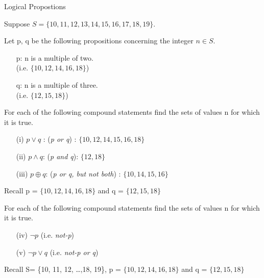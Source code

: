 

{Logical Propostions}

Suppose $S = \{10,11,12,13,14,15,16,17,18,19\}$.

Let p, q be the following propositions concerning the integer $n \in S$.
\begin{itemize}
\item[p:] n is a multiple of two. \\(i.e. $\{10,12,14,16,18\}$)
\item[q:] n is a multiple of three. \\(i.e. $\{12,15,18\}$)
\end{itemize}

For each of the following compound statements find the sets of values n for which it is true. 

\begin{itemize}
\item[(i)] $p \vee q$ : (\textit{p or q}) :  $\{10, 12, 14, 15, 16, 18\}$ 
\item[(ii)] $p \wedge q$: (\textit{p and q}):  $\{12, 18\}$
\item[(iii)] $ p \oplus q$: (\textit{p or q, but not both}) :  $\{10, 14, 15, 16\}$
\end{itemize}

Recall p = $\{10,12,14,16,18\}$  and q = $\{12,15,18\}$


For each of the following compound statements find the sets of values n for which it is true. %
\begin{itemize}
\item[(iv)] $\neg p $  (i.e. \textit{not-p}) %
\item[(v)] $\neg p \vee q$  (i.e. \textit{not-p or q}) %
\end{itemize}

Recall S= \{10, 11, 12, \ldots ,18, 19\}, p = $\{10,12,14,16,18\}$  and q = $\{12,15,18\}$


